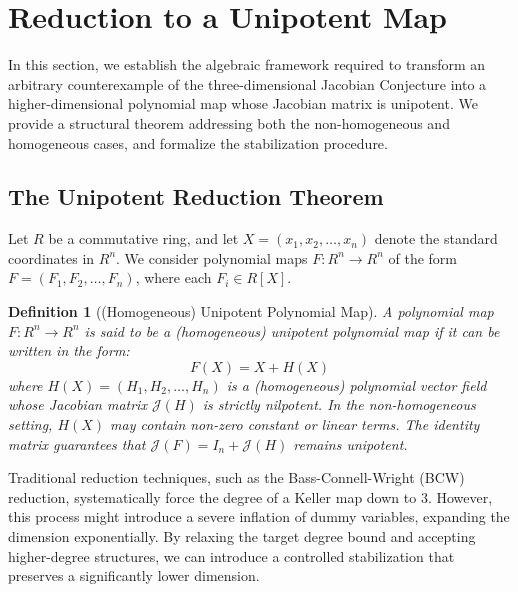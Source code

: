 \documentclass[11pt,a4paper]{article}
\newtheorem{definition}[theorem]{Definition}
\begin{document}

\section{Reduction to a Unipotent Map}
\label{sec:unipotent_reduction}

In this section, we establish the algebraic framework required to transform an arbitrary counterexample of the three-dimensional Jacobian Conjecture into a higher-dimensional polynomial map whose Jacobian matrix is unipotent. We provide a structural theorem addressing both the non-homogeneous and homogeneous cases, and formalize the stabilization procedure.

\subsection{The Unipotent Reduction Theorem}

Let $R$ be a commutative ring, and let $X = (x_1, x_2, \dots, x_n)$ denote the standard coordinates in $R^n$. We consider polynomial maps $F: R^n \to R^n$ of the form $F = (F_1, F_2, \dots, F_n)$, where each $F_i \in R[X]$.

\begin{definition}[(Homogeneous) Unipotent Polynomial Map]
A polynomial map $F: R^n \to R^n$ is said to be a \emph{(homogeneous) unipotent polynomial map} if it can be written in the form:
\begin{equation}
F(X) = X + H(X)
\end{equation}
where $H(X) = (H_1, H_2, \dots, H_n)$ is a (homogeneous) polynomial vector field whose Jacobian matrix $\mathcal{J}(H)$ is strictly nilpotent. In the non-homogeneous setting, $H(X)$ may contain non-zero constant or linear terms. The identity matrix guarantees that $\mathcal{J}(F) = I_n + \mathcal{J}(H)$ remains unipotent.
\end{definition}

Traditional reduction techniques, such as the Bass-Connell-Wright (BCW) reduction, systematically force the degree of a Keller map down to $3$. However, this process might introduce a severe inflation of dummy variables, expanding the dimension exponentially. By relaxing the target degree bound and accepting higher-degree structures, we can introduce a controlled stabilization that preserves a significantly lower dimension.
\end{document}
